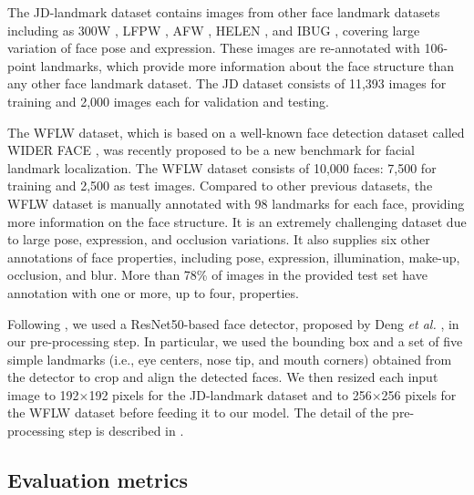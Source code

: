 \documentclass[journal]{IEEEtran}
\begin{document}
The JD-landmark dataset contains images from other face landmark datasets including as 300W \cite{Sagonas2013, Sagonas2016}, LFPW \cite{Belhumeur2013}, AFW \cite{Zhu2012}, HELEN \cite{brandt2012}, and IBUG \cite{sagonas2013b}, covering large variation of face pose and expression. 
These images are re-annotated with 106-point landmarks, which provide more information about the face structure than any other face landmark dataset.  
The JD dataset consists of 11,393 images for training and 2,000 images each for validation and testing. 

The WFLW dataset, which is based on a well-known face detection dataset called WIDER FACE \cite{yang2016wider}, was recently proposed to be a new benchmark for facial landmark localization.
The WFLW dataset consists of 10,000 faces: 7,500 for training and 2,500 as test images. 
Compared to other previous datasets, the WFLW dataset is manually annotated with 98 landmarks for each face, providing more information on the face structure. 
It is an extremely challenging dataset due to large pose, expression, and occlusion variations.
It also supplies six other annotations of face properties, including pose, expression, illumination, make-up, occlusion, and blur. 
More than 78\% of images in the provided test set have annotation with one or more, up to four, properties.

Following \cite{earp2021sub}, we used a ResNet50-based face detector, proposed by Deng \textit{et al.} \cite{deng2019}, in our pre-processing step. 
In particular, we used the bounding box and a set of five simple landmarks (i.e., eye centers, nose tip, and mouth corners) obtained from the detector to crop and align the detected faces.
We then resized each input image to 192$\times$192 pixels for the JD-landmark dataset and to 256$\times$256 pixels for the WFLW dataset before feeding it to our model.
The detail of the pre-processing step is described in \cite{earp2021sub}.


\subsection{Evaluation metrics}\label{subsec:metrics}
\end{document}
